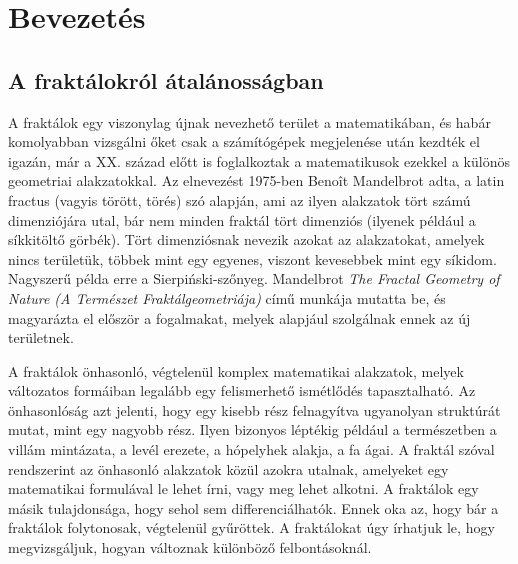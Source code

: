 \chapter*{Bevezetés}
\section*{A fraktálokról átalánosságban}
A fraktálok egy viszonylag újnak nevezhető terület a matematikában, és habár komolyabban vizsgálni őket csak a számítógépek megjelenése után kezdték el igazán, már a XX. század előtt is foglalkoztak a matematikusok ezekkel a különös geometriai alakzatokkal. Az elnevezést 1975-ben Benoît Mandelbrot adta, a latin fractus (vagyis törött, törés) szó alapján, ami az ilyen alakzatok tört számú dimenziójára utal, bár nem minden fraktál tört dimenziós (ilyenek például a síkkitöltő görbék). \cite{fraktal}
Tört dimenziósnak nevezik azokat az alakzatokat, amelyek nincs területük, többek mint egy egyenes, viszont kevesebbek mint egy síkidom. Nagyszerű példa erre a Sierpiński-szőnyeg. Mandelbrot {\it The Fractal Geometry of Nature (A Természet Fraktálgeometriája)} című munkája mutatta be, és magyarázta el először a fogalmakat, melyek alapjául szolgálnak ennek az új területnek.
\par A fraktálok önhasonló, végtelenül komplex matematikai alakzatok, melyek változatos formáiban legalább egy felismerhető ismétlődés tapasztalható. Az önhasonlóság azt jelenti, hogy egy kisebb rész felnagyítva ugyanolyan struktúrát mutat, mint egy nagyobb rész. Ilyen bizonyos léptékig például a természetben a villám mintázata, a levél erezete, a hópelyhek alakja, a fa ágai. A fraktál szóval rendszerint az önhasonló alakzatok közül azokra utalnak, amelyeket egy matematikai formulával le lehet írni, vagy meg lehet alkotni. A fraktálok egy másik tulajdonsága, hogy sehol sem differenciálhatók. Ennek oka az, hogy bár a fraktálok folytonosak, végtelenül gyűröttek. A fraktálokat úgy írhatjuk le, hogy megvizsgáljuk, hogyan változnak különböző felbontásoknál. 
